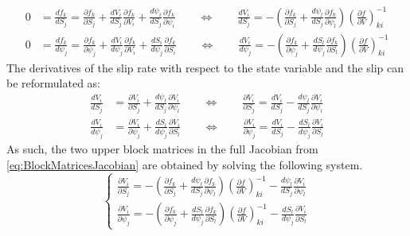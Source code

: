 \documentclass{report}
\begin{document}
\begin{align}
    0 &= \frac{df_k}{dS_j} =     
	\frac{\partial f_k}{\partial S_j} + 
	\frac{d V_i}{d S_j}\frac{\partial f_k}{\partial V_i} + 
	\frac{d \psi_i}{d S_j}\frac{\partial f_k}{\partial \psi_i} 
	\qquad\Leftrightarrow\qquad
	\frac{d V_i}{d S_j} = -\left(\frac{\partial f_k}{\partial S_j} + \frac{d \psi_l}{d S_j}\frac{\partial f_k}{\partial \psi_l} \right)\left(\frac{\partial f}{\partial V}\right)_{ki}^{-1} 
	\label{eq:SEASDAE_partialdV_dS} \\
    0 &= \frac{df_k}{d\psi_j} = 
    \frac{\partial f_k}{\partial \psi_j} + 
    \frac{d V_i}{d \psi_j}\frac{\partial f_k}{\partial V_i} + 
    \frac{d S_i}{d \psi_j}\frac{\partial f_k}{\partial S_i}
    \qquad\Leftrightarrow\qquad
    \frac{d V_i}{d \psi_j} = -\left(\frac{\partial f_k}{\partial \psi_j}  + 
    \frac{d S_l}{d \psi_j}\frac{\partial f_k}{\partial S_l}\right)\left(\frac{\partial f}{\partial V}\right)_{ki}^{-1} \label{eq:SEASDAE_partialdV_dpsi}
\end{align}
The derivatives of the slip rate with respect to the state variable and the slip can be reformulated as: 
\begin{align}
	\frac{dV_i}{dS_j} &= \frac{\partial V_i}{\partial S_j} + \frac{d\psi_l}{dS_j} \frac{\partial V_i}{\partial \psi_l} 
	\qquad\Leftrightarrow\qquad
	\frac{\partial V_i}{\partial S_j} = \frac{dV_i}{dS_j} - \frac{d\psi_l}{dS_j} \frac{\partial V_i}{\partial \psi_l} \\
	\frac{dV_i}{d\psi_j} &= \frac{\partial V_i}{\partial \psi_j} + \frac{dS_l}{d\psi_j} \frac{\partial V_i}{\partial S_l} 
	\qquad\Leftrightarrow\qquad
	\frac{\partial V_i}{\partial \psi_j} = \frac{dV_i}{dS_j} - \frac{dS_l}{d\psi_j} \frac{\partial V_i}{\partial S_l}	
\end{align}
As such, the two upper block matrices in the full Jacobian from \autoref{eq:BlockMatricesJacobian} are obtained by solving the following system. 
\begin{equation}
\label{eq:systemJacobianSlipRate}
\begin{cases}
	\frac{\partial V_i}{\partial S_j} = -\left(\frac{\partial f_k}{\partial S_j} + \frac{d \psi_l}{d S_j}\frac{\partial f_k}{\partial \psi_l} \right)\left(\frac{\partial f}{\partial V}\right)_{ki}^{-1} - \frac{d\psi_l}{dS_j} \frac{\partial V_i}{\partial \psi_l} \\
	\frac{\partial V_i}{\partial \psi_j} = -\left(\frac{\partial f_k}{\partial \psi_j}  + 
	\frac{d S_l}{d \psi_j}\frac{\partial f_k}{\partial S_l}\right)\left(\frac{\partial f}{\partial V}\right)_{ki}^{-1} - \frac{dS_l}{d\psi_j} \frac{\partial V_i}{\partial S_l}	
\end{cases}
\end{equation}
\end{document}
